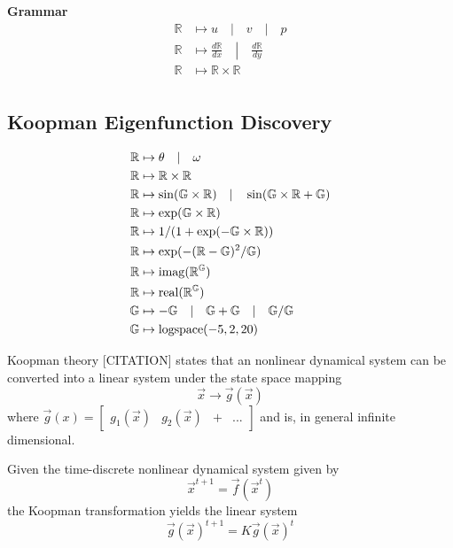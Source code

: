 \documentclass{article}
\begin{document}
\textbf{Grammar}
\begin{align*}
  \mathbb{R} &\mapsto u \quad | \quad v \quad | \quad p \\
  \mathbb{R} &\mapsto \frac{d\mathbb{R}}{dx} \quad \left| \quad \frac{d\mathbb{R}}{dy} \right. \\
  \mathbb{R} &\mapsto \mathbb{R} \times \mathbb{R} \\
\end{align*}

\subsection{Koopman Eigenfunction Discovery}

\begin{align*}
\mathbb{R} &\mapsto \theta \quad | \quad \omega \\
\mathbb{R} &\mapsto \mathbb{R} \times \mathbb{R} \\
\mathbb{R} &\mapsto \sin (\mathbb{G} \times \mathbb{R}) \quad | \quad \sin (\mathbb{G} \times \mathbb{R} + \mathbb{G}) \\
\mathbb{R} &\mapsto {\rm exp}(\mathbb{G} \times \mathbb{R}) \\
\mathbb{R} &\mapsto 1 / (1 + {\rm exp}(-\mathbb{G} \times \mathbb{R})) \\
\mathbb{R} &\mapsto {\rm exp}(-(\mathbb{R}-\mathbb{G})^2/\mathbb{G}) \\
\mathbb{R} &\mapsto {\rm imag}(\mathbb{R}^\mathbb{G}) \\
\mathbb{R} &\mapsto {\rm real}(\mathbb{R}^\mathbb{G}) \\
\mathbb{G} &\mapsto -\mathbb{G} \quad | \quad \mathbb{G}+\mathbb{G} \quad | \quad \mathbb{G}/\mathbb{G} \\
\mathbb{G} &\mapsto {\rm logspace(-5, 2, 20)}
\end{align*}

Koopman theory [CITATION] states that an nonlinear dynamical system can be converted into a linear system under the state space mapping
\[ \vec{x} \rightarrow \vec{g}(\vec{x}) \]
where $\vec{g}(x) = \begin{bmatrix} g_1(\vec{x}) & g_2(\vec{x}) & + & ... \end{bmatrix}$ and is, in general infinite dimensional.

Given the time-discrete nonlinear dynamical system given by
\[ \vec{x}^{t+1} = \vec{f}(\vec{x}^t)\]
the Koopman transformation yields the linear system
\[ \vec{g}(\vec{x})^{t+1} = K \vec{g}(\vec{x})^{t} \]
\end{document}
